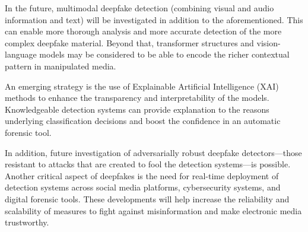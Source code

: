 \documentclass[conference]{IEEEtran}
\begin{document}
In the future, multimodal deepfake detection (combining visual and audio information and text) will be investigated in addition to the aforementioned. This can enable more thorough analysis and more accurate detection of the more complex deepfake material. Beyond that, transformer structures and vision-language models may be considered to be able to encode the richer contextual pattern in manipulated media.

An emerging strategy is the use of Explainable Artificial Intelligence (XAI) methods to enhance the transparency and interpretability of the models. Knowledgeable detection systems can provide explanation to the reasons underlying classification decisions and boost the confidence in an automatic forensic tool.

In addition, future investigation of adversarially robust deepfake detectors---those resistant to attacks that are created to fool the detection systems---is possible. Another critical aspect of deepfakes is the need for real-time deployment of detection systems across social media platforms, cybersecurity systems, and digital forensic tools. These developments will help increase the reliability and scalability of measures to fight against misinformation and make electronic media trustworthy.




\nocite{*}
\printbibliography
\end{document}
